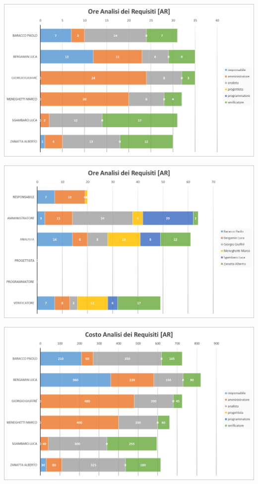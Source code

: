 	{\includegraphics[width=15cm]{img/orear1.png}\par}

	{\includegraphics[width=15cm]{img/orear2.png}\par}

	{\includegraphics[width=15cm]{img/costoar.png}\par}

